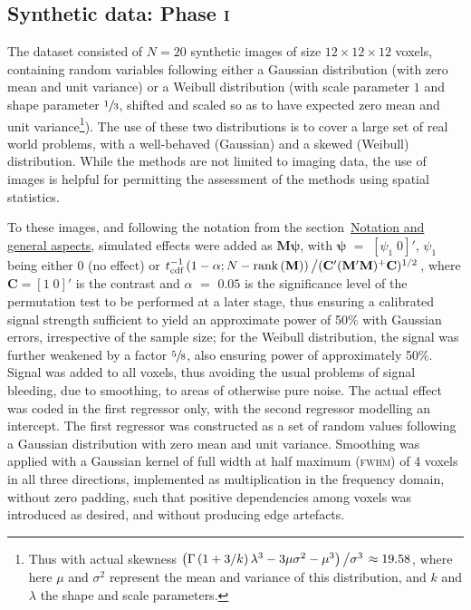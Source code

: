 \subsection{Synthetic data: Phase \textsc{i}}

The dataset consisted of $N=20$ synthetic images of size $12 \times 12 \times 12$ voxels, containing random variables following either a Gaussian distribution (with zero mean and unit variance) or a Weibull distribution (with scale parameter $1$ and shape parameter $\sfrac{1}{3}$, shifted and scaled so as to have expected zero mean and unit variance\footnote{Thus with actual skewness $\left(\Gamma\left(1+3/k\right)\lambda^3-3\mu\sigma^2-\mu^3\right)\left/\sigma^3\right. \approx 19.58$, where here $\mu$ and $\sigma^2$ represent the mean and variance of this distribution, and $k$ and $\lambda$ the shape and scale parameters.}). The use of these two distributions is to cover a large set of real world problems, with a well-behaved (Gaussian) and a skewed (Weibull) distribution. While the methods are not limited to imaging data, the use of images is helpful for permitting the assessment of the methods using spatial statistics.

To these images, and following the notation from the section~\href{sec:accel:notation}{Notation and general aspects}, simulated effects were added as $\mathbf{M}\boldsymbol{\psi}$, with $\boldsymbol{\psi}$ $=$ $[\psi_1 \; 0]'$, $\psi_1$ being either 0 (no effect) or $t^{-1}_{\text{cdf}}\left(1-\alpha ; N-\text{rank}\left(\mathbf{M}\right)\right)\left/(\mathbf{C}'(\mathbf{M}'\mathbf{M})^+\mathbf{C})^{1/2}\right.$, where $\mathbf{C} = [1 \; 0]'$ is the contrast and $\alpha$ $=$ $0.05$ is the significance level of the permutation test to be performed at a later stage, thus ensuring a calibrated signal strength sufficient to yield an approximate power of 50\% with Gaussian errors, irrespective of the sample size; for the Weibull distribution, the signal was further weakened by a factor $\sfrac{5}{8}$, also ensuring power of approximately 50\%. Signal was added to all voxels, thus avoiding the usual problems of signal bleeding, due to smoothing, to areas of otherwise pure noise. The actual effect was coded in the first regressor only, with the second regressor modelling an intercept. The first regressor was constructed as a set of random values following a Gaussian distribution with zero mean and unit variance. Smoothing was applied with a Gaussian kernel of full width at half maximum (\textsc{fwhm}) of 4 voxels in all three directions, implemented as multiplication in the frequency domain, without zero padding, such that positive dependencies among voxels was introduced as desired, and without producing edge artefacts.

